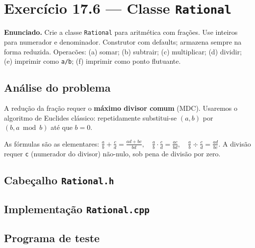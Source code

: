\documentclass[11pt,a4paper]{article}
\begin{document}
\newpage
\section{Exerc\'icio 17.6 --- Classe \texttt{Rational}}

\begin{enunciado}
\textbf{Enunciado.} Crie a classe \texttt{Rational} para aritm\'etica com fra\c{c}\~oes. Use inteiros para numerador e denominador. Construtor com defaults; armazena sempre na forma reduzida. Operac\~oes: (a) somar; (b) subtrair; (c) multiplicar; (d) dividir; (e) imprimir como \texttt{a/b}; (f) imprimir como ponto flutuante.
\end{enunciado}

\subsection*{An\'alise do problema}

A redu\c{c}\~ao da fra\c{c}\~ao requer o \textbf{m\'aximo divisor comum} (MDC). Usaremos o algoritmo de Euclides cl\'assico: repetidamente substitui-se $(a, b)$ por $(b, a \bmod b)$ at\'e que $b = 0$.

As f\'ormulas s\~ao as elementares:
$\frac{a}{b} + \frac{c}{d} = \frac{ad + bc}{bd}, \quad \frac{a}{b} \cdot \frac{c}{d} = \frac{ac}{bd}, \quad \frac{a}{b} \div \frac{c}{d} = \frac{ad}{bc}.$
A divis\~ao requer \texttt{c} (numerador do divisor) n\~ao-nulo, sob pena de divis\~ao por zero.

\subsection*{Cabe\c{c}alho \texttt{Rational.h}}



\subsection*{Implementa\c{c}\~ao \texttt{Rational.cpp}}



\subsection*{Programa de teste}
\end{document}
